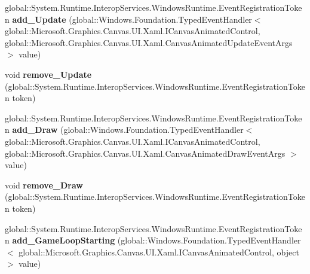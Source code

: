 \begin{DoxyCompactItemize}
global\+::\+System.\+Runtime.\+Interop\+Services.\+Windows\+Runtime.\+Event\+Registration\+Token {\bfseries add\+\_\+\+Update} (global\+::\+Windows.\+Foundation.\+Typed\+Event\+Handler$<$ global\+::\+Microsoft.\+Graphics.\+Canvas.\+U\+I.\+Xaml.\+I\+Canvas\+Animated\+Control, global\+::\+Microsoft.\+Graphics.\+Canvas.\+U\+I.\+Xaml.\+Canvas\+Animated\+Update\+Event\+Args $>$ value)
\item 
\mbox{\label{interface_microsoft_1_1_graphics_1_1_canvas_1_1_u_i_1_1_xaml_1_1_i_canvas_animated_control_aab80ec4a2429b892a73b2956101de68e}} 
void {\bfseries remove\+\_\+\+Update} (global\+::\+System.\+Runtime.\+Interop\+Services.\+Windows\+Runtime.\+Event\+Registration\+Token token)
\item 
\mbox{\label{interface_microsoft_1_1_graphics_1_1_canvas_1_1_u_i_1_1_xaml_1_1_i_canvas_animated_control_a12cf4dde742dabd53cdca14d77e049f4}} 
global\+::\+System.\+Runtime.\+Interop\+Services.\+Windows\+Runtime.\+Event\+Registration\+Token {\bfseries add\+\_\+\+Draw} (global\+::\+Windows.\+Foundation.\+Typed\+Event\+Handler$<$ global\+::\+Microsoft.\+Graphics.\+Canvas.\+U\+I.\+Xaml.\+I\+Canvas\+Animated\+Control, global\+::\+Microsoft.\+Graphics.\+Canvas.\+U\+I.\+Xaml.\+Canvas\+Animated\+Draw\+Event\+Args $>$ value)
\item 
\mbox{\label{interface_microsoft_1_1_graphics_1_1_canvas_1_1_u_i_1_1_xaml_1_1_i_canvas_animated_control_a92b78e42e9c4487aa3aceec75cb19108}} 
void {\bfseries remove\+\_\+\+Draw} (global\+::\+System.\+Runtime.\+Interop\+Services.\+Windows\+Runtime.\+Event\+Registration\+Token token)
\item 
\mbox{\label{interface_microsoft_1_1_graphics_1_1_canvas_1_1_u_i_1_1_xaml_1_1_i_canvas_animated_control_ace3201e05768ec0cb189a06a8287c709}} 
global\+::\+System.\+Runtime.\+Interop\+Services.\+Windows\+Runtime.\+Event\+Registration\+Token {\bfseries add\+\_\+\+Game\+Loop\+Starting} (global\+::\+Windows.\+Foundation.\+Typed\+Event\+Handler$<$ global\+::\+Microsoft.\+Graphics.\+Canvas.\+U\+I.\+Xaml.\+I\+Canvas\+Animated\+Control, object $>$ value)

\end{DoxyCompactItemize}
